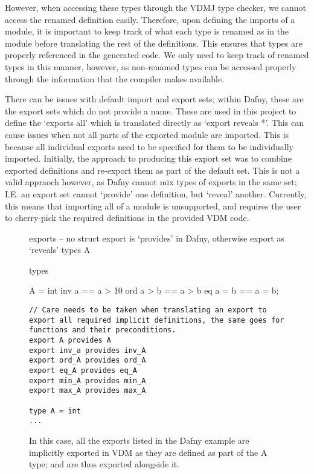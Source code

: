 \documentclass{entcs}
\begin{document}
However, when accessing these types through the VDMJ type checker, we cannot access the renamed definition easily. Therefore, upon defining the imports of a module, it is important to keep track of what each type is renamed as in the module before translating the rest of the definitions. This ensures that types are properly referenced in the generated code. We only need to keep track of renamed types in this manner, however, as non-renamed types can be accessed properly through the information that the compiler makes available.

There can be issues with default import and export sets; within Dafny, these are the export sets which do not provide a name. These are used in this project to define the `exports all' which is translated directly as `export reveals *'. This can cause issues when not all parts of the exported module are imported. This is because all individual exports need to be specified for them to be individually imported. Initially, the approach to producing this export set was to combine exported definitions and re-export them as part of the default set. This is not a valid appraoch however, as Dafny cannot mix types of exports in the same set; I.E. an export set cannot `provide' one definition, but `reveal' another. Currently, this means that importing all of a module is unsupported, and requires the user to cherry-pick the required definitions in the provided VDM code.

\begin{figure}[h]
	\begin{center}
        \begin{vdmsl}
exports 
    -- no struct export is `provides' in Dafny, otherwise export as `reveals'
    types A

types 

A = int 
inv a == a > 10
ord a > b == a > b
eq a = b == a = b;
        
        \end{vdmsl}
        \begin{lstlisting}[language=Dafny]
// Care needs to be taken when translating an export to export all required implicit definitions, the same goes for functions and their preconditions.
export A provides A
export inv_a provides inv_A
export ord_A provides ord_A
export eq_A provides eq_A
export min_A provides min_A
export max_A provides max_A

type A = int 
...
        \end{lstlisting}
		\caption{In this case, all the exports listed in the Dafny example are implicitly exported in VDM as they are defined as part of the A type; and are thus exported alongside it.}\label{fig:dafny_exports}
	\end{center}
\end{figure}
\end{document}
